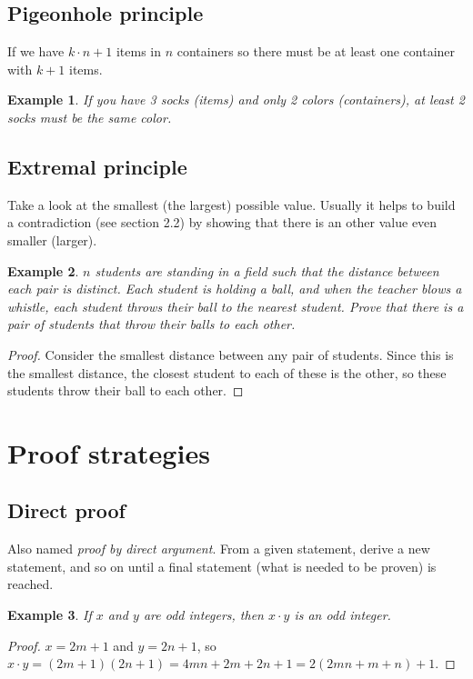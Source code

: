 \documentclass[11pt]{article}
\newtheorem{theorem}{Example}
\begin{document}
\subsection{Pigeonhole principle}

If we have $k \cdot n+1$ items in $n$ containers so there must be at least one container with $k+1$ items.

\begin{theorem}
  If you have 3 socks (items) and only 2 colors (containers), at least 2 socks must be the same color. 
\end{theorem}

\subsection{Extremal principle} 

Take a look at the smallest (the largest) possible value. Usually it helps to build a contradiction (see section 2.2) by showing that there is an other value even smaller (larger).

\begin{theorem}
  $n$ students are standing in a field such that the distance between each pair is distinct. Each student is holding a ball, and when the teacher blows a whistle, each student throws their ball to the nearest student. Prove that there is a pair of students that throw their balls to each other.
\end{theorem}
\begin{proof}
  Consider the smallest distance between any pair of students. Since this is the smallest distance, the closest student to each of these is the other, so these students throw their ball to each other. 
\end{proof}

\section{Proof strategies}

\subsection{Direct proof}

Also named \emph{proof by direct argument}. From a given statement, derive a new statement, and so on until a final statement (what is needed to be proven) is reached.

\begin{theorem}
  If $x$ and $y$ are odd integers, then $x \cdot y$ is an odd integer.
\end{theorem}
\begin{proof}
  $x = 2m + 1$ and $y = 2n + 1$, so $x \cdot y = (2m + 1)(2n +1) = 4mn + 2m + 2n + 1 = 2(2mn + m + n) + 1$.
\end{proof}
\end{document}
